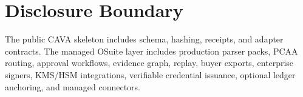 \documentclass[11pt]{article}
\begin{document}
\section{Disclosure Boundary}

The public CAVA skeleton includes schema, hashing, receipts, and adapter contracts. The managed OSuite layer includes production parser packs, PCAA routing, approval workflows, evidence graph, replay, buyer exports, enterprise signers, KMS/HSM integrations, verifiable credential issuance, optional ledger anchoring, and managed connectors.



\end{document}
